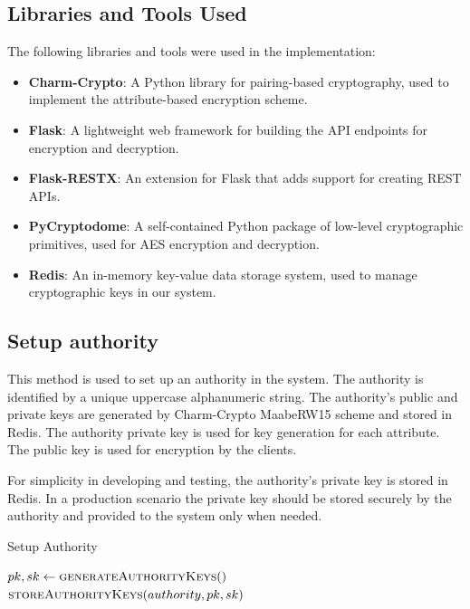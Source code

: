 \documentclass[cic,tc,english]{iiufrgs}
\begin{document}
        \subsection{Libraries and Tools Used}
            \label{sec:libraries}

            The following libraries and tools were used in the implementation:

            \begin{itemize}
                \item \textbf{Charm-Crypto}: A Python library for pairing-based cryptography, used to implement the attribute-based encryption scheme.
                \item \textbf{Flask}: A lightweight web framework for building the API endpoints for encryption and decryption.
                \item \textbf{Flask-RESTX}: An extension for Flask that adds support for creating REST APIs.
                \item \textbf{PyCryptodome}: A self-contained Python package of low-level cryptographic primitives, used for AES encryption and decryption.
                \item \textbf{Redis}: An in-memory key-value data storage system, used to manage cryptographic keys in our system.
            \end{itemize}


        \subsection{Setup authority}
            This method is used to set up an authority in the system. The authority is identified by a unique uppercase alphanumeric string. The authority's public and private keys are generated by Charm-Crypto MaabeRW15\cite{rouselakis2015efficient} scheme and stored in Redis. The authority private key is used for key generation for each attribute. The public key is used for encryption by the clients.

            For simplicity in developing and testing, the authority's private key is stored in Redis. In a production scenario the private key should be stored securely by the authority and provided to the system only when needed.

            \begin{algorithm}
                \caption{Setup Authority}
                \label{alg:setup_authority}
                \begin{algorithmic}[1]
                    \State $pk, sk \gets \textsc{generateAuthorityKeys}()$
                    \State $\textsc{storeAuthorityKeys}(authority, pk, sk)$
                \EndProcedure
                \end{algorithmic}
            \end{algorithm}
\end{document}

